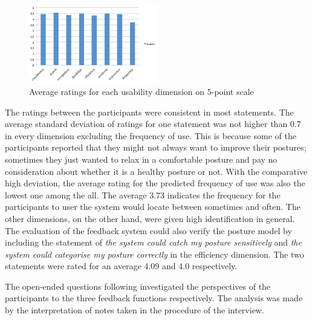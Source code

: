 \begin{figure}[h]
\centering
  \includegraphics[width=0.5\textwidth]{figs/dimension}
\caption{Average ratings for each usability dimension on 5-point scale}
\label{fig:usability_ratings}
\end{figure}

The ratings between the participants were consistent in most statements. The average standard deviation of ratings for one statement was not higher than 0.7 in every dimension excluding the frequency of use. This is because some of the participants reported that they might not always want to improve their postures; sometimes they just wanted to relax in a comfortable posture and pay no consideration about whether it is a healthy posture or not. With the comparative high deviation, the average rating for the predicted frequency of use was also the lowest one among the all. The average 3.73 indicates the frequency for the participants to user the system would locate between sometimes and often. The other dimensions, on the other hand, were given high identification in general. The evaluation of the feedback system could also verify the posture model by including the statement of \textit{the system could catch my posture sensitively} and \textit{the system could categorise my posture correctly} in the efficiency dimension. The two statements were rated for an average 4.09 and 4.0 respectively.

The open-ended questions following investigated the perspectives of the participants to the three feedback functions respectively. The analysis was made by the interpretation of notes taken in the procedure of the interview.

